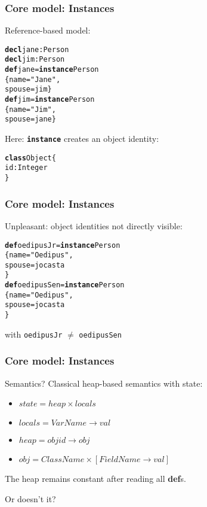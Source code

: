 \documentclass{beamer}
\begin{document}
\begin{frame}[fragile]\frametitle{Core model: Instances}

  Reference-based model:
\begin{alltt}
\textbf{decl} jane: Person
\textbf{decl} jim: Person
\textbf{def} jane = \textbf{instance} Person
       \{ name = "Jane",
         spouse = jim \}
\textbf{def} jim = \textbf{instance} Person
       \{ name = "Jim",
         spouse = jane \}
\end{alltt}

Here: \textbf{\texttt{instance}} creates an object identity:

\begin{alltt}
\textbf{class} Object \{
   id: Integer
\}
\end{alltt}

\end{frame}

\begin{frame}[fragile]\frametitle{Core model: Instances}

  Unpleasant: object identities not directly visible:

  \begin{alltt}
\textbf{def} oedipusJr = \textbf{instance} Person
                \{name = "Oedipus",
                 spouse = jocasta
\}
\textbf{def} oedipusSen = \textbf{instance} Person
                 \{name = "Oedipus",
                  spouse = jocasta
\}
  \end{alltt}    

  with \texttt{oedipusJr} $\neq$ \texttt{oedipusSen}
  
\end{frame}

\begin{frame}[fragile]\frametitle{Core model: Instances}

  Semantics? Classical heap-based semantics with state:

  \begin{itemize}
  \item $state = heap \times locals$
  \item $locals = VarName \to val$
  \item $heap = objid \to obj$
  \item $obj = ClassName \times [FieldName \to val]$
  \end{itemize}

  The heap remains constant after reading all \textbf{def}s.

  Or doesn't it?

\end{frame}
\end{document}

